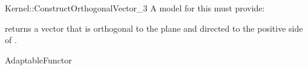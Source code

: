 \begin{ccRefFunctionObjectConcept}{Kernel::ConstructOrthogonalVector_3}
A model for this must provide:


{returns a vector that is orthogonal to the plane  and directed
 to the positive side of .}

\ccRefines
AdaptableFunctor

\ccSeeAlso
{} \\

\end{ccRefFunctionObjectConcept}

